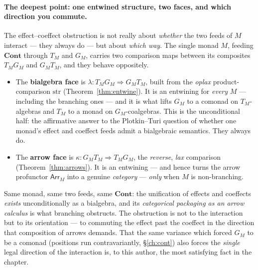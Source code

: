 \documentclass[11pt,a4paper]{book}
\newcommand{\Cont}{\mathbf{Cont}}
\newcommand{\str}{\mathrm{str}}
\newcommand{\Arr}{\mathsf{Arr}}
\theoremstyle{plain}
\theoremstyle{definition}
\theoremstyle{remark}
\begin{document}
\paragraph{The deepest point: one entwined structure, two faces, and which
direction you commute.} The effect--coeffect obstruction is not really about
\emph{whether} the two feeds of $M$ interact --- they always do --- but about
\emph{which way}. The single monad $M$, feeding $\Cont$ through $T_{M}$ and $G_{M}$,
carries two comparison maps between its composites $T_{M}G_{M}$ and $G_{M}T_{M}$, and
they behave oppositely.
\begin{itemize}[nosep]
  \item The \textbf{bialgebra face} is $\lambda\colon T_{M}G_{M}\Rightarrow G_{M}T_{M}$,
        built from the \emph{oplax} product-comparison $\str$ (Theorem~\ref{thm:entwine}).
        It is an entwining for \emph{every} $M$ --- including the branching ones ---
        and it is what lifts $G_{M}$ to a comonad on $T_{M}$-algebras and $T_{M}$ to a
        monad on $G_{M}$-coalgebras. This is the unconditional half: the affirmative
        answer to the Plotkin--Turi question of whether one monad's effect and coeffect
        feeds admit a bialgebraic semantics. They always do.
  \item The \textbf{arrow face} is $\kappa\colon G_{M}T_{M}\Rightarrow T_{M}G_{M}$, the
        \emph{reverse}, \emph{lax} comparison (Theorem~\ref{thm:arrows}). It is an
        entwining --- and hence turns the arrow profunctor $\Arr_{M}$ into a genuine
        \emph{category} --- \emph{only} when $M$ is non-branching.
\end{itemize}
Same monad, same two feeds, same $\Cont$: the unification of effects and coeffects
\emph{exists} unconditionally as a bialgebra, and its \emph{categorical packaging as
an arrow calculus} is what branching obstructs. The obstruction is not to the
interaction but to its orientation --- to commuting the effect past the coeffect in
the direction that composition of arrows demands. That the same variance which
forced $G_{M}$ to be a comonad (positions run contravariantly, \S\ref{ch:cont})
also forces the \emph{single} legal direction of the interaction is, to this author,
the most satisfying fact in the chapter.
\end{document}
